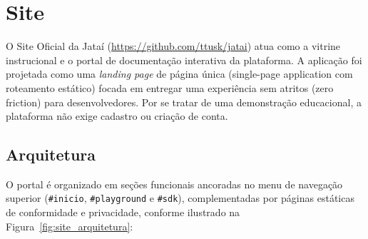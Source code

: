 \documentclass[
  12pt,
  openright,
  oneside,
  a4paper,
  brazilian
]{abntex2}
\begin{document}
\section{Site}
\label{sec:site_oficial}

O Site Oficial da Jataí (\url{https://github.com/ttusk/jatai}) atua como a vitrine instrucional e o portal de documentação interativa da plataforma. A aplicação foi projetada como uma \textit{landing page} de página única (single-page application com roteamento estático) focada em entregar uma experiência sem atritos (zero friction) para desenvolvedores. Por se tratar de uma demonstração educacional, a plataforma não exige cadastro ou criação de conta.

\subsection{Arquitetura}
O portal é organizado em seções funcionais ancoradas no menu de navegação superior (\texttt{\#inicio}, \texttt{\#playground} e \texttt{\#sdk}), complementadas por páginas estáticas de conformidade e privacidade, conforme ilustrado na Figura~\ref{fig:site_arquitetura}:
\end{document}
